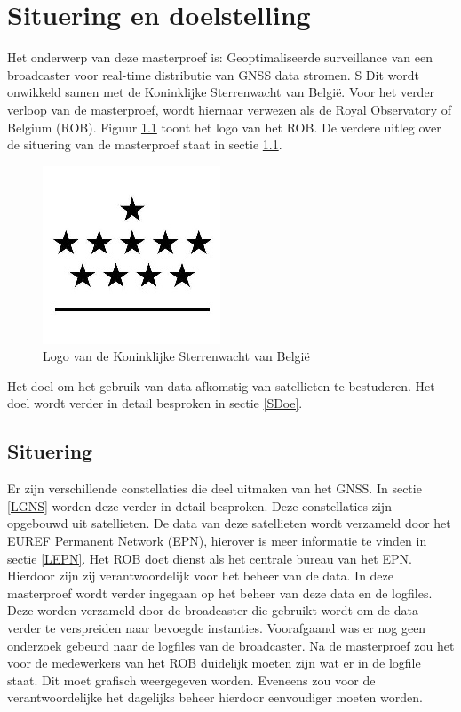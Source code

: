 \newcommand*{\MyIndentSit}{\hspace*{1 cm}}%

\chapter{Situering en doelstelling}
\label{Situering}
Het onderwerp van deze masterproef is: \newline
\MyIndentSit Geoptimaliseerde surveillance van een broadcaster voor real-time distributie van GNSS data stromen.
S
Dit wordt onwikkeld samen met de Koninklijke Sterrenwacht van Belgi\"e. Voor het verder verloop van de masterproef, wordt hiernaar verwezen als de Royal Observatory of Belgium (ROB). Figuur \ref{imgROB} toont het logo van het ROB. De verdere uitleg over de situering van de masterproef staat in sectie \ref{SSit}.

\begin{figure}[hbp]
	\includegraphics[scale=1]{ROB.jpg}
	\centering
	\caption{Logo van de Koninklijke Sterrenwacht van Belgi\"e \cite{SImgROB}}
	\label{imgROB}
\end{figure} 

Het doel om het gebruik van data afkomstig van satellieten te bestuderen. Het doel wordt verder in detail besproken in sectie \ref{SDoe}.

\section{Situering}
\label{SSit}
Er zijn verschillende constellaties die deel uitmaken van het GNSS. In sectie \ref{LGNS} worden deze verder in detail besproken. Deze constellaties zijn opgebouwd uit satellieten. De data van deze satellieten wordt verzameld door het EUREF Permanent Network (EPN), hierover is meer informatie te vinden in sectie \ref{LEPN}. Het ROB doet dienst als het centrale bureau van het EPN. Hierdoor zijn zij verantwoordelijk voor het beheer van de data. In deze masterproef wordt verder ingegaan op het beheer van deze data en de logfiles. Deze worden verzameld door de broadcaster die gebruikt wordt om de data verder te verspreiden naar bevoegde instanties. Voorafgaand was er nog geen onderzoek gebeurd naar de logfiles van de broadcaster. Na de masterproef zou het voor de medewerkers van het ROB duidelijk moeten zijn wat er in de logfile staat. Dit moet grafisch weergegeven worden. Eveneens zou voor de verantwoordelijke het dagelijks beheer hierdoor eenvoudiger moeten worden. 

